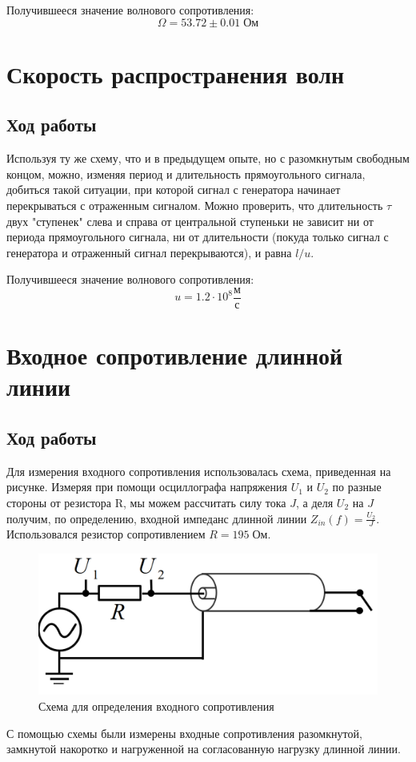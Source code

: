 \documentclass[a4paper,14pt]{extarticle}
\begin{document}
		Получившееся значение волнового сопротивления:
		\begin{equation}
			\Omega = 53.72 \pm 0.01 \; \text{Ом}
		\end{equation}
	\section{Скорость распространения волн}
		\subsection{Ход работы}
			Используя ту же схему, что и в предыдущем опыте, но с разомкнутым свободным концом, можно, изменяя период и длительность прямоугольного сигнала, добиться такой ситуации, при которой сигнал с генератора начинает перекрываться с отраженным сигналом. Можно проверить, что длительность $\tau$ двух "ступенек" слева и справа от центральной ступеньки не зависит ни от периода прямоугольного сигнала, ни от длительности (покуда только сигнал с генератора и отраженный сигнал перекрываются), и равна $l / u$.
			
			Получившееся значение волнового сопротивления:
			\begin{equation}
				u = 1.2 \cdot 10^8 \frac{\text{м}}{\text{с}}
			\end{equation}
	\section{Входное сопротивление длинной линии}
		\subsection{Ход работы}
			Для измерения входного сопротивления использовалась схема, приведенная на рисунке. Измеряя при помощи осциллографа напряжения $U_1$ и $U_2$ по разные стороны от резистора R, мы можем рассчитать силу тока $J$, а деля $U_2$ на $J$ получим, по определению, входной импеданс длинной линии $Z_{in}(f)= \frac{U_2}{J}$. Использовался резистор сопротивлением $R = 195 \; \text{Ом}$.
			\begin{figure}[h!]
				\centering
				\includegraphics[width=.85\linewidth]{схема2.png}
				\caption{Схема для определения входного сопротивления}
				\label{fig2}
			\end{figure}
			\newpage
			С помощью схемы были измерены входные сопротивления разомкнутой, замкнутой накоротко и нагруженной на согласованную нагрузку длинной линии.
\end{document}
